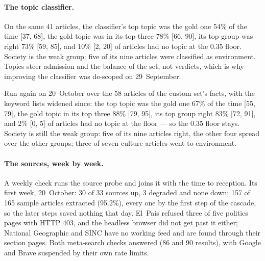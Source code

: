 \paragraph{The topic classifier.} On the same 41 articles, the
classifier's top topic was the gold one 54\% of the time [37, 68], the
gold topic was in its top three 78\% [66, 90], its top group was right
73\% [59, 85], and 10\% [2, 20] of articles had no topic at the 0.35
floor. Society is the weak group: five of its nine articles were
classified as environment. Topics steer admission and the balance of
the set, not verdicts, which is why improving the classifier was
de-scoped on 29~September.

Run again on 20~October over the 58 articles of the custom set's facts,
with the keyword lists widened since: the top topic was the gold one
67\% of the time [55, 79], the gold topic in its top three 88\% [79, 95],
its top group right 83\% [72, 91], and 2\% [0, 5] of articles had no
topic at the floor --- so the 0.35 floor stays. Society is still the weak
group: five of its nine articles right, the other four spread over the
other groups; three of seven culture articles went to environment.

\paragraph{The sources, week by week.} A weekly check runs the source
probe and joins it with the time to reception. Its first week,
20~October: 30 of 33 sources up, 3 degraded and none down; 157 of 165
sample articles extracted (95.2\%), every one by the first step of the
cascade, so the later steps saved nothing that day. El~País refused
three of five politics pages with HTTP 403, and the headless browser did
not get past it either; National Geographic and SINC have no working
feed and are found through their section pages. Both meta-search checks
answered (86 and 90 results), with Google and Brave suspended by their
own rate limits.

